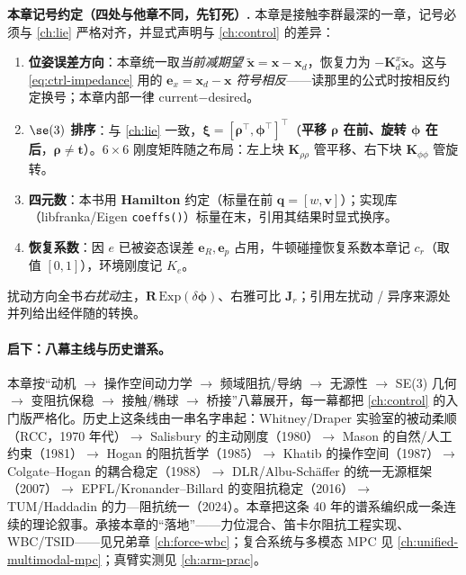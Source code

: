 \begin{note}
\textbf{本章记号约定（四处与他章不同，先钉死）.}\;
本章是接触李群最深的一章，记号必须与 \cref{ch:lie} 严格对齐，并显式声明与 \cref{ch:control} 的差异：
\begin{enumerate}
  \item \textbf{位姿误差方向}：本章统一取\emph{当前减期望} $\tilde{\mathbf x}=\mathbf x-\mathbf x_d$，恢复力为 $-\mathbf K_d^x\tilde{\mathbf x}$。这与 \cref{eq:ctrl-impedance} 用的 $\mathbf e_x=\mathbf x_d-\mathbf x$ \emph{符号相反}——读那里的公式时按相反约定换号；本章内部一律 current$-$desired。
  \item \textbf{$\se(3)$ 排序}：与 \cref{ch:lie} 一致，$\boldsymbol\xi=[\boldsymbol\rho^\top,\boldsymbol\phi^\top]^\top$（\textbf{平移 $\boldsymbol\rho$ 在前、旋转 $\boldsymbol\phi$ 在后}，$\boldsymbol\rho\neq\mathbf t$）。$6\times6$ 刚度矩阵随之布局：左上块 $\mathbf K_{\rho\rho}$ 管平移、右下块 $\mathbf K_{\phi\phi}$ 管旋转。
  \item \textbf{四元数}：本书用 \textbf{Hamilton} 约定（标量在前 $\mathbf q=[w,\mathbf v]$）；实现库（libfranka/Eigen \texttt{coeffs()}）标量在末，引用其结果时显式换序。
  \item \textbf{恢复系数}：因 $e$ 已被姿态误差 $\mathbf e_R,\mathbf e_p$ 占用，牛顿碰撞恢复系数本章记 $c_r$（取值 $[0,1]$），环境刚度记 $K_e$。
\end{enumerate}
扰动方向全书\emph{右扰动}主，$\mathbf R\,\mathrm{Exp}(\delta\boldsymbol\phi)$、右雅可比 $\mathbf J_r$；引用左扰动 / 异序来源处并列给出经伴随的转换。
\end{note}

\paragraph{启下：八幕主线与历史谱系。}
本章按“动机 $\to$ 操作空间动力学 $\to$ 频域阻抗/导纳 $\to$ 无源性 $\to$ SE(3) 几何 $\to$ 变阻抗保稳 $\to$ 接触/椭球 $\to$ 桥接”八幕展开，每一幕都把 \cref{ch:control} 的入门版严格化。历史上这条线由一串名字串起：Whitney/Draper 实验室的被动柔顺（RCC，1970 年代）$\to$ Salisbury 的主动刚度（1980）$\to$ Mason 的自然/人工约束（1981）$\to$ Hogan 的阻抗哲学（1985）$\to$ Khatib 的操作空间（1987）$\to$ Colgate--Hogan 的耦合稳定（1988）$\to$ DLR/Albu-Sch\"affer 的统一无源框架（2007）$\to$ EPFL/Kronander--Billard 的变阻抗稳定（2016）$\to$ TUM/Haddadin 的力—阻抗统一（2024）。本章把这条 40 年的谱系编织成一条连续的理论叙事。承接本章的“落地”——力位混合、笛卡尔阻抗工程实现、WBC/TSID——见兄弟章 \cref{ch:force-wbc}；复合系统与多模态 MPC 见 \cref{ch:unified-multimodal-mpc}；真臂实测见 \cref{ch:arm-prac}。

